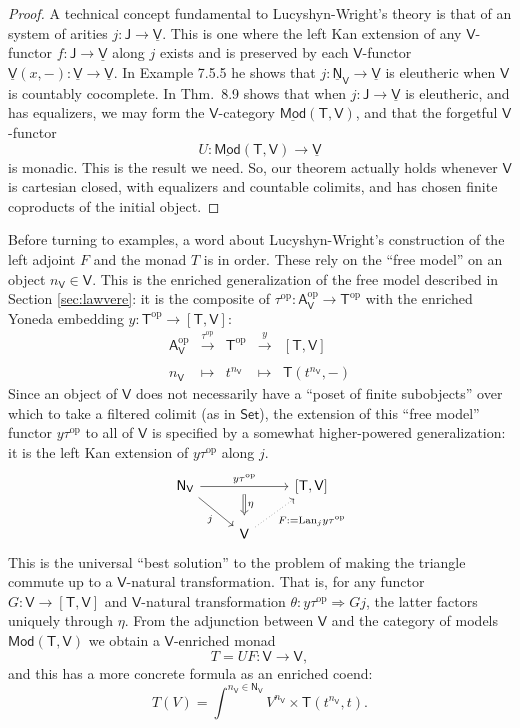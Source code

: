 \documentclass{amsart}
\newcommand{\define}[1]{{\bf \boldmath{#1}}}
\theoremstyle{definition}
\newcommand{\Set}{\mathsf{Set}}
\newcommand{\Mod}{\mathsf{Mod}}
\newcommand{\NN}{\mathsf{N}}
\newcommand{\A}{\mathsf{A}}
\newcommand{\V}{\mathsf{V}}
\newcommand{\J}{\mathsf{J}}
\newcommand{\T}{\mathsf{T}}
\newcommand{\op}{\mathrm{op}}
\newcommand{\maps}{\colon}
\begin{document}
\begin{proof}
A technical concept fundamental to Lucyshyn-Wright's theory is that of an \define{eleutheric} system of arities $j \maps \J \to \underline{\V}$.  This is one where the left Kan extension of any $\V$-functor $f \maps \J \to \underline{\V}$ along $j$ exists and is preserved by each $\V$-functor $\underline{\V}(x,-) \maps \underline{\V} \to \underline{\V}$.  In Example 7.5.5 he shows that $j \maps \underline{\NN}_\V \to \underline{\V}$ is eleutheric when $\V$ is countably cocomplete.  In Thm.\ 8.9 shows that when $j \maps \J \to \underline{\V}$ is eleutheric, and has equalizers, we may form the $\V$-category $\underline{\Mod}(\T,\V)$, and that the forgetful $\V$-functor
\[   U \maps \underline{\Mod}(\T,\V) \to \underline{\V} \]
is monadic.  This is the result we need.   So, our theorem actually holds whenever $\V$ is cartesian closed, with equalizers and countable colimits, and has chosen finite coproducts of the initial object.  \end{proof}

Before turning to examples, a word about Lucyshyn-Wright's construction of the left adjoint $F$ and the monad $T$ is in order.  These rely on the ``free model'' on an object $n_\V \in \V$.   This is the enriched generalization of the free model described in Section \ref{sec:lawvere}: it is the composite of $\tau^\op\maps \A_\V^\op \to \T^\op$ with the enriched Yoneda embedding $y\maps \T^\op \to [\T,\V]$:
\[
\begin{array}{rllll}
\A_\V^\op & \xrightarrow{\tau^\op} & \T^\op & \xrightarrow{y} & \left[\T,\V\right]\\
\\
n_\V & \mapsto & t^{n_\V} & \mapsto & \T(t^{n_\V},-)
\end{array}
\]
Since an object of $\V$ does not necessarily have a ``poset of finite subobjects'' over which to take a filtered colimit (as in $\Set$), the extension of this ``free model'' functor $y \tau^\op$ to all of $\V$ is specified by a somewhat higher-powered generalization: it is the left Kan extension of $y\tau^{\op}$ along $j$.
\[\begin{tikzcd}
\NN_\V \arrow[rr,"y\tau^\op"{name=y}] \arrow[swap,rd,"j"] & & \left[\T,\V\right]\\
& \V \arrow[swap,dotted, ru,"F:=\mathrm{Lan}_jy\tau^{\op}"] \arrow[Rightarrow,from=y,"\eta", shorten >=0.2cm,shorten <=.2cm]
\end{tikzcd}\]
This is the universal ``best solution'' to the problem of making the triangle commute up to a $\V$-natural transformation.  That is, for any functor $G \maps \V \to [\T,\V]$ and $\V$-natural transformation $\theta \maps y\tau^{\op} \Rightarrow Gj$, the latter factors uniquely through $\eta$.
From the adjunction between $\V$ and the category of models $\Mod(\T,\V)$ we obtain a $\V$-enriched monad
\[       T = U F \maps \V \to \V, \]
and this has a more concrete formula as an enriched coend:
\[
T(V) = \int^{n_\V\in \NN_\V} V^{n_\V} \times \T(t^{n_\V},t).
\]
\end{document}
